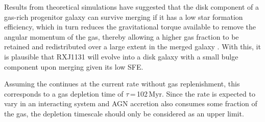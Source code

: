 \documentclass[]{emulateapj}
\begin{document}
Results from theoretical simulations have suggested that 
the disk component of a gas-rich progenitor galaxy can 
survive merging if it has a low star formation efficiency, which in turn
reduces the gravitational torque available to 
remove the angular momentum of the gas, thereby allowing
a higher gas fraction to be retained and redistributed over a large extent in
the merged galaxy \citep{Hopkins09a}. With this, it is plausible that RXJ1131 
will evolve into a disk galaxy with a small bulge component upon merging given its low SFE.
%

Assuming the \SF continues at the current rate without gas replenishment, this corresponds to a 
gas depletion time of $\tau$\,=\,102\,Myr.
Since the \SF rate is expected to vary in an interacting system and
AGN accretion also consumes some fraction of the gas, the depletion
timescale should only be considered as an upper limit. 



\end{document}
